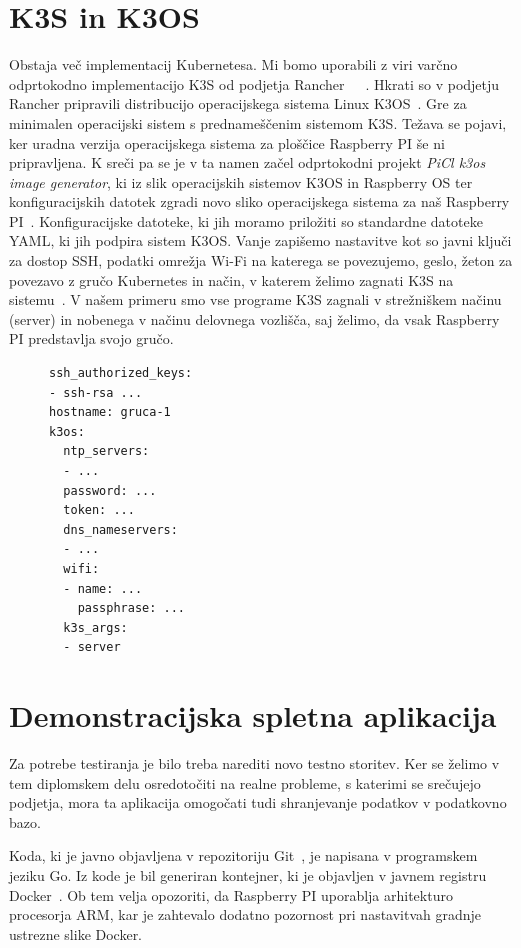 \documentclass[a4paper, 12pt]{book}
\begin{document}
\section{K3S in K3OS}
Obstaja več implementacij Kubernetesa.
Mi bomo uporabili z viri varčno odprtokodno implementacijo K3S od podjetja Rancher~\cite{k3s-info}~\cite{k8s-performance-comparison}~\cite{low-resource-k8s}.
Hkrati so v podjetju Rancher pripravili distribucijo operacijskega sistema Linux K3OS~\cite{k3os-git}.
Gre za minimalen operacijski sistem s prednameščenim sistemom K3S.
Te\-ža\-va se pojavi, ker uradna verzija operacijskega sistema za ploščice Raspberry PI še ni pripravljena.
K sreči pa se je v ta namen začel odprtokodni projekt \emph{PiCl k3os image generator}, ki iz slik operacijskih sistemov K3OS in Raspberry OS ter konfiguracijskih datotek zgradi novo sliko operacijskega sistema za naš Raspberry PI~\cite{k3os-rpi-image-generator}.
Konfiguracijske datoteke, ki jih moramo priložiti so standardne datoteke YAML, ki jih podpira sistem K3OS.
Vanje zapišemo nastavitve kot so javni ključi za dostop SSH, podatki omrežja Wi-Fi na katerega se povezujemo, geslo, žeton za povezavo z gručo Kubernetes in način, v katerem želimo zagnati K3S na sistemu~\cite{k3os-git}.
V našem primeru smo vse programe K3S zagnali v strežniškem načinu (server) in nobenega v načinu delovnega vozlišča, saj želimo, da vsak Raspberry PI predstavlja svojo gručo.
\begin{figure}[h]
\begin{verbatim}
ssh_authorized_keys:
- ssh-rsa ...
hostname: gruca-1
k3os:
  ntp_servers:
  - ...
  password: ...
  token: ...
  dns_nameservers:
  - ... 
  wifi:
  - name: ...
    passphrase: ...
  k3s_args:
  - server
\end{verbatim}
\end{figure}

\section{Demonstracijska spletna aplikacija}
Za potrebe testiranja je bilo treba narediti novo testno storitev.
Ker se želimo v tem diplomskem delu osredotočiti na realne probleme, s katerimi se srečujejo podjetja, mora ta aplikacija omogočati tudi shranjevanje podatkov v podatkovno bazo.

Koda, ki je javno objavljena v repozitoriju Git~\cite{git-stateful-rest-sample}, je napisana v programskem jeziku Go.
Iz kode je bil generiran kontejner, ki je objavljen v javnem registru Docker~\cite{docker-stateful-rest-sample}.
Ob tem velja opozoriti, da Raspberry PI uporablja arhitekturo procesorja ARM, kar je zahtevalo dodatno pozornost pri nastavitvah gradnje ustrezne slike Docker.
\end{document}

